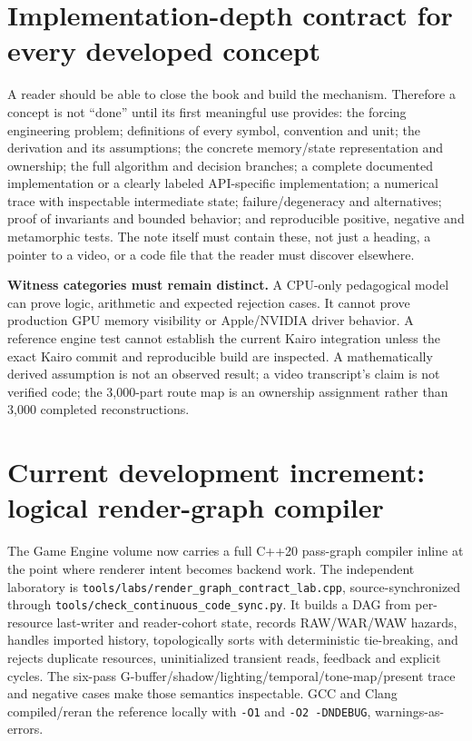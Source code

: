 \section{Implementation-depth contract for every developed concept}\label{appendix-28e6f216fdc7-implementation-depth-contract-for-every-developed-concept}

A reader should be able to close the book and build the mechanism. Therefore a concept is not ``done'' until its first meaningful use provides: the forcing engineering problem; definitions of every symbol, convention and unit; the derivation and its assumptions; the concrete memory/state representation and ownership; the full algorithm and decision branches; a complete documented implementation or a clearly labeled API-specific implementation; a numerical trace with inspectable intermediate state; failure/degeneracy and alternatives; proof of invariants and bounded behavior; and reproducible positive, negative and metamorphic tests. The note itself must contain these, not just a heading, a pointer to a video, or a code file that the reader must discover elsewhere.

\textbf{Witness categories must remain distinct.} A CPU-only pedagogical model can prove logic, arithmetic and expected rejection cases. It cannot prove production GPU memory visibility or Apple/NVIDIA driver behavior. A reference engine test cannot establish the current Kairo integration unless the exact Kairo commit and reproducible build are inspected. A mathematically derived assumption is not an observed result; a video transcript's claim is not verified code; the 3,000-part route map is an ownership assignment rather than 3,000 completed reconstructions.

\section{Current development increment: logical render-graph compiler}\label{appendix-28e6f216fdc7-current-development-increment-logical-render-graph-compiler}

The Game Engine volume now carries a full C++20 pass-graph compiler inline at the point where renderer intent becomes backend work. The independent laboratory is \texttt{tools/labs/render\_graph\_contract\_lab.cpp}, source-synchronized through \texttt{tools/check\_continuous\_code\_sync.py}. It builds a DAG from per-resource last-writer and reader-cohort state, records RAW/WAR/WAW hazards, handles imported history, topologically sorts with deterministic tie-breaking, and rejects duplicate resources, uninitialized transient reads, feedback and explicit cycles. The six-pass G-buffer/shadow/lighting/temporal/tone-map/present trace and negative cases make those semantics inspectable. GCC and Clang compiled/reran the reference locally with \texttt{-O1} and \texttt{-O2\ -DNDEBUG}, warnings-as-errors.

